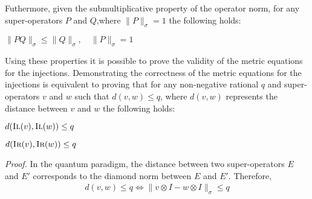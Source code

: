 Futhermore, given the submultiplicative property of the operator norm, for any super-operators $P$ and $Q$,where $\lVert P \rVert_{\sigma} =1  $ the following holds:
\begin{lemma}\label{lemleq}
  $\lVert PQ \rVert_{\sigma} \leq  \lVert Q \rVert_{\sigma}, \quad \lVert P \rVert_{\sigma}  =1 $ 
\end{lemma}

Using these properties it is possible to prove the validity of the metric equations for the injections. Demonstrating the correctness of the metric equations for the injections is equivalent to proving that for any  non‑negative rational $q$ and super-operators $v$ and $w$ such that $d(v,w) \leq q$, where  $d(v,w)$ represents the distance between $v$ and $w$ the following holds:

\begin{theorem} \label{theoremil}
  $d(\textsc{Il}(v),\textsc{Il} (w)) \leq q$
\end{theorem}
\vspace{10pt}
\begin{theorem} \label{theoremir}
  $d(\textsc{Ir}(v),\textsc{Ir} (w)) \leq q$
\end{theorem}
\vspace{10pt}
\textit{Proof.} \quad In the quantum paradigm, the distance between two super-operators $E$ and $E'$ corresponds to the diamond norm between $E$ and $E'$. Therefore,
\begin{equation}
\begin{split}
  d(v,w) \leq q \Leftrightarrow \lVert v \otimes I - w \otimes I \rVert_{\sigma} \leq q
\end{split}
\end{equation}

